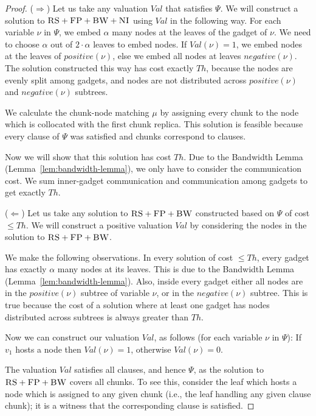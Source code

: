 \documentclass[conference,10pt]{IEEEtran}
\newcommand{\variab}{\nu}
\newcommand{\clauses}{\alpha}
\newcommand{\CC}{\textsc{NI}}
\newcommand{\FP}{\textsc{FP}}
\newcommand{\RS}{\textsc{RS}}
\newcommand{\BW}{\textsc{BW}}
\newcommand{\Formula}{\ensuremath{\Psi}}
\newcommand{\Thr}{\ensuremath{Th}}
\newcommand{\positive}{\ensuremath{positive}}
\newcommand{\negative}{\ensuremath{negative}}
\newcommand{\Val}{\ensuremath{Val}}
\begin{document}
\begin{appendix}
\begin{proof}
($\Rightarrow$) Let us take any valuation $\Val$ that satisfies $\Formula$.
We will construct a solution to $\RS+\FP+\BW+\CC$ using $\Val$ in the following
way.
For each variable $\variab$ in $\Formula$, we embed $\clauses$ many nodes
at the  leaves of the gadget of $\variab$. We need to choose $\clauses$ out of
$2 \cdot \clauses$ leaves to embed nodes. If $\Val(\variab) = 1$, we embed
nodes at the leaves
of $\positive(\variab)$, else we embed all nodes at leaves $\negative(\variab)$.
The solution constructed this way has cost exactly
$\Thr$, because the nodes are evenly split among gadgets, and nodes are not
distributed across $\positive(\variab)$ and $\negative(\variab)$ subtrees.

We calculate the chunk-node matching $\mu$ by assigning every chunk to
the node which is collocated with the first chunk replica. This solution is feasible
because every clause of
$\Psi$ was satisfied and chunks correspond to clauses.

Now we will show that this solution has cost $\Thr$.
Due to the Bandwidth Lemma (Lemma~\ref{lem:bandwidth-lemma}),
we only have to consider the communication cost. We sum inner-gadget communication and communication among gadgets to get exactly $\Thr$.

($\Leftarrow$) Let us take any solution to $\RS+\FP+\BW$ constructed based on $\Formula$ of cost $\leq \Thr$.
We will construct a positive valuation $\Val$ by considering the nodes in
the solution to $\RS+\FP+\BW$.

We make the following observations. In every solution of cost
$\leq \Thr$, every gadget has exactly $\clauses$ many nodes
at its leaves. This is due to the Bandwidth Lemma (Lemma~\ref{lem:bandwidth-lemma}).
Also, inside
every gadget either all nodes are in the $\positive(\variab)$ subtree
of variable $\variab$, or in the $\negative(\variab)$ subtree. This is true
because the cost of a solution where at least one gadget has nodes
distributed across subtrees is
always greater than $\Thr$.

Now we can construct our valuation $\Val$, as follows
(for each variable $\variab$ in $\Formula$):
If $v_1$ hosts a node then $\Val(\variab) = 1$,
otherwise $\Val(\variab) = 0$.

The valuation $\Val$ satisfies all clauses, and hence $\Formula$,
as the solution to $\RS+\FP+\BW$ covers all chunks. To see this,
consider the leaf which
hosts a node which is assigned to any given chunk (i.e.,
the leaf handling any given clause chunk);
it is a witness that the corresponding clause is satisfied.
\end{proof}


\end{appendix}
\end{document}
